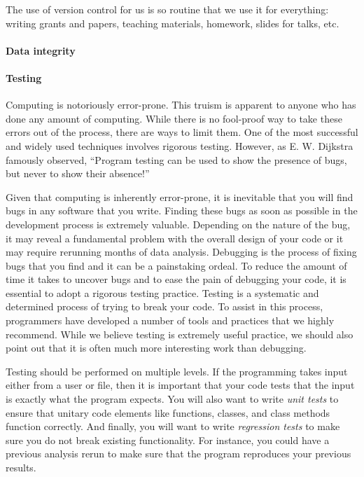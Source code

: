 \documentclass[ChapterTOCs,krantz2]{krantz} %
\begin{document}
The use of version control for us is so routine that we use it for everything:
writing grants and papers, teaching materials, homework, slides for talks, etc.


\paragraph{ {\bf Data integrity}}

\paragraph{ {\bf Testing}} Computing is notoriously error-prone. This truism is
apparent to anyone who has done any amount of computing. While there is no
fool-proof way to take these errors out of the process, there are ways to limit
them. One of the most successful and widely used techniques involves rigorous
testing.  However, as E. W. Dijkstra famously observed, ``Program testing can
be used to show the presence of bugs, but never to show their absence!''
\cite{dahl1972structured}

Given that computing is inherently error-prone, it is inevitable that you will
find bugs in any software that you write. Finding these bugs as soon as
possible in the development process is extremely valuable. Depending on the
nature of the bug, it may reveal a fundamental problem with the overall design
of your code or it may require rerunning months of data analysis. Debugging is
the process of fixing bugs that you find and it can be a painstaking ordeal. To
reduce the amount of time it takes to uncover bugs and to ease the pain of
debugging your code, it is essential to adopt a rigorous testing practice.
Testing is a systematic and determined process of trying to break your code.
To assist in this process, programmers have developed a number of tools and
practices that we highly recommend. While we believe testing is extremely
useful practice, we should also point out that it is often much more
interesting work than debugging.

Testing should be performed on multiple levels. If the programming takes input
either from a user or file, then it is important that your code tests that the
input is exactly what the program expects. You will also want to write \emph{unit
tests} to ensure that unitary code elements like functions, classes, and
class methods function correctly. And finally, you will want to write
\emph{regression tests} to make sure you do not break existing functionality.
For instance, you could have a previous analysis rerun to make sure that
the program reproduces your previous results.
\end{document}
